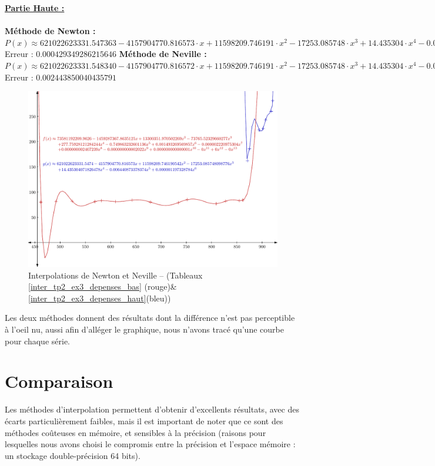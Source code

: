 \documentclass{report}
\begin{document}
	\noindent\underline{\textbf{Partie Haute :}} \\ \\
	\textbf{Méthode de Newton :}\\
	$P(x) \approx 621022623331.547363-4157904770.816573 \cdot x + 11598209.746191 \cdot x^{2} - 17253.085748 \cdot x^{3}  + 14.435304 \cdot x^{4} - 0.006441 \cdot x^{5}  + 0.000001 \cdot x^{6} $\\
	Erreur : $0.000429349286215646$
	\newline
	\newline
	\textbf{Méthode de Neville :}\\
	$P(x) \approx 621022623331.548340-4157904770.816572 \cdot x + 11598209.746191 \cdot x^{2} - 17253.085748 \cdot x^{3}  + 14.435304 \cdot x^{4} - 0.006441 \cdot x^{5}  + 0.000001 \cdot x^{6} $\\
	Erreur : $0.002443850040435791$
      \newpage
      \begin{figure}[h]
	\centering
	\includegraphics[scale=0.85]{graphiques/pdf_output/inter_tp2_ex3.pdf}
	\caption{Interpolations de Newton et Neville -- (Tableaux \ref{inter_tp2_ex3_depenses_bas} (rouge)\& \ref{inter_tp2_ex3_depenses_haut}(bleu))}
      \end{figure}
      
      Les deux méthodes donnent des résultats dont la différence n'est pas perceptible à l'oeil nu, aussi afin d'alléger le graphique, nous n'avons tracé qu'une courbe pour chaque série.
    \newpage
    \section{Comparaison}
      Les méthodes d'interpolation permettent d'obtenir d'excellents résultats, avec des écarts particulièrement faibles, mais il est important de noter que ce sont des méthodes coûteuses en mémoire, et sensibles à la précision (raisons pour lesquelles nous avons choisi le compromis entre la précision et l'espace mémoire : un stockage double-précision 64 bits).\\ \\
      
\end{document}
